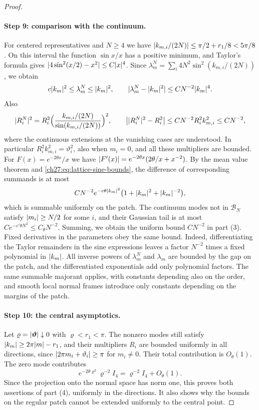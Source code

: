 \begin{proof}
\paragraph{Step 9: comparison with the continuum.}
For centered representatives and $N\ge4$ we have $\lvert k_{m,i}/(2N)\rvert\le\pi/2+r_1/8<5\pi/8$. On this interval the function $\sin x/x$ has a positive minimum, and Taylor's formula gives $\lvert 4\sin^2(x/2)-x^2\rvert\le C\lvert x\rvert^4$. Since $\lambda_m^N=\sum_i4N^2\sin^2(k_{m,i}/(2N))$, we obtain
\begin{equation}\label{ch27:eq:lattice-sine-bounds}
 c\lvert k_m\rvert^2\le\lambda_m^N\le\lvert k_m\rvert^2,\qquad\lvert \lambda_m^N-\lvert k_m\rvert^2\rvert\le CN^{-2}\lvert k_m\rvert^4.
\end{equation}
Also
\[
 \lvert R_i^N\rvert^2=R_i^2\Bigl(\frac{k_{m,i}/(2N)}{\sin(k_{m,i}/(2N))}\Bigr)^2,\qquad\bigl\lvert\lvert R_i^N\rvert^2-R_i^2\bigr\rvert\le CN^{-2}R_i^2k_{m,i}^2\le CN^{-2},
\]
where the continuous extensions at the vanishing cases are understood. In particular $R_i^2k_{m,i}^2=\vartheta_i^2$, also when $m_i=0$, and all these multipliers are bounded. For $F(x)=e^{-2\theta x}/x$ we have $\lvert F'(x)\rvert=e^{-2\theta x}(2\theta/x+x^{-2})$. By the mean value theorem and \eqref{ch27:eq:lattice-sine-bounds}, the difference of corresponding summands is at most
\[
 CN^{-2}e^{-c\theta\lvert k_m\rvert^2}\bigl(1+\lvert k_m\rvert^2+\lvert k_m\rvert^{-2}\bigr),
\]
which is summable uniformly on the patch. The continuum modes not in $\mathcal B_N$ satisfy $\lvert m_i\rvert\ge N/2$ for some $i$, and their Gaussian tail is at most $Ce^{-c'\theta N^2}\le C_\theta N^{-2}$. Summing, we obtain the uniform bound $CN^{-2}$ in part (3). Fixed derivatives in the parameters obey the same bound. Indeed, differentiating the Taylor remainders in the sine expressions leaves a factor $N^{-2}$ times a fixed polynomial in $\lvert k_m\rvert$. All inverse powers of $\lambda_m^N$ and $\lambda_m$ are bounded by the gap on the patch, and the differentiated exponentials add only polynomial factors. The same summable majorant applies, with constants depending also on the order, and smooth local normal frames introduce only constants depending on the margins of the patch.

\paragraph{Step 10: the central asymptotics.}
Let $\varrho=\lvert \bm\vartheta\rvert\downarrow0$ with $\varrho<r_1<\pi$. The nonzero modes still satisfy $\lvert k_m\rvert\ge2\pi\lvert m\rvert-r_1$, and their multipliers $R_i$ are bounded uniformly in all directions, since $\lvert 2\pi m_i+\vartheta_i\rvert\ge\pi$ for $m_i\ne0$. Their total contribution is $O_\theta(1)$. The zero mode contributes
\[
 e^{-2\theta\varrho^2}\varrho^{-2}I_4=\varrho^{-2}I_4+O_\theta(1).
\]
Since the projection onto the normal space has norm one, this proves both assertions of part (4), uniformly in the directions. It also shows why the bounds on the regular patch cannot be extended uniformly to the central point.
\end{proof}

